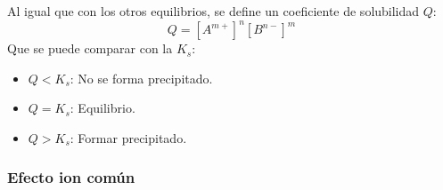 \documentclass[arial,a4paper,print]{article}
\begin{document}
Al igual que con los otros equilibrios, se define un coeficiente de solubilidad $Q$:
\begin{equation*}
	Q = [A^{m+}]^{n}[B^{n-}]^{m}
\end{equation*}
Que se puede comparar con la $K_{s}$:
\begin{itemize}
\item $Q < K_{s}$: No se forma precipitado.
\item $Q = K_{s}$: Equilibrio.
\item $Q > K_{s}$: Formar precipitado. 
\end{itemize}

\subsubsection{Efecto ion común}
\end{document}
